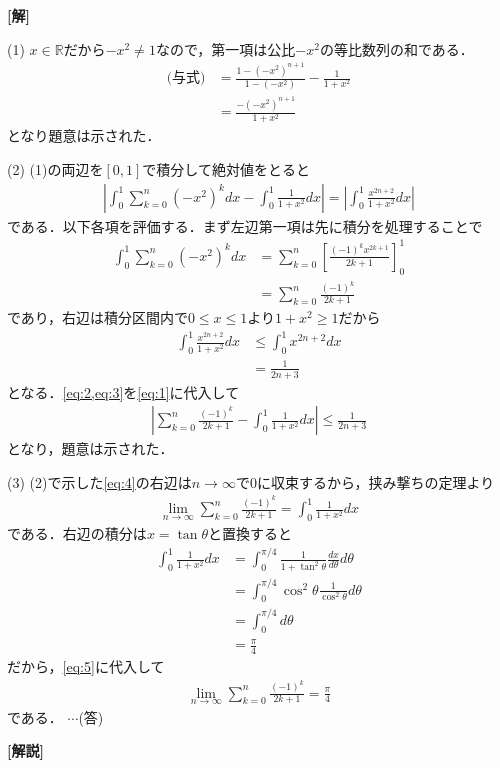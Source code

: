 \documentclass[a4paper,10pt]{ltjsarticle}
\begin{document}
\begin{multicols}{2}
  {\bf[解]}

  (1)
  $x \in \mathbb{R}$だから$-x^2 \neq 1$なので，第一項は公比$-x^2$の等比数列の和である．
  \begin{align*}
    \text{(与式)}
     & = \frac{1-(-x^2)^{n+1}}{1-(-x^2)} - \frac{1}{1+x^2} \\
     & = \frac{-(-x^2)^{n+1}}{1+x^2}
  \end{align*}
  となり題意は示された．

  \vspace{10pt}
  (2)
  (1)の両辺を$[0,1]$で積分して絶対値をとると
  \begin{align}
    \left| \int_0^1 \sum_{k=0}^n (-x^2)^k dx - \int_0^1 \frac{1}{1+x^2} dx \right|
    = \left| \int_0^1 \frac{x^{2n+2}}{1+x^2} dx \right| \label{eq:1}
  \end{align}
  である．以下各項を評価する．まず左辺第一項は先に積分を処理することで
  \begin{align}
    \int_0^1 \sum_{k=0}^n (-x^2)^k dx
     & = \sum_{k=0}^n \left[ \frac{(-1)^k x^{2k+1}}{2k+1} \right]_0^1 \nonumber \\
     & = \sum_{k=0}^n \frac{(-1)^k}{2k+1} \label{eq:2}
  \end{align}
  であり，右辺は積分区間内で$0\le x\le 1$より$1+x^2\ge 1$だから
  \begin{align}
    \int_0^1 \frac{x^{2n+2}}{1+x^2} dx
     & \le \int_0^1 x^{2n+2} dx      \nonumber \\
     & = \frac{1}{2n+3} \label{eq:3}
  \end{align}
  となる．\cref{eq:2,eq:3}を\cref{eq:1}に代入して
  \begin{align}
    \left| \sum_{k=0}^n \frac{(-1)^k}{2k+1} - \int_0^1 \frac{1}{1+x^2} dx \right| \le \frac{1}{2n+3} \label{eq:4}
  \end{align}
  となり，題意は示された．

  \vspace{10pt}
  (3)
  (2)で示した\cref{eq:4}の右辺は$n\to\infty$で$0$に収束するから，挟み撃ちの定理より
  \begin{align}
    \lim_{n\to\infty} \sum_{k=0}^n \frac{(-1)^k}{2k+1} = \int_0^1 \frac{1}{1+x^2} dx \label{eq:5}
  \end{align}
  である．右辺の積分は$x=\tan\theta$と置換すると
  \begin{align*}
    \int_0^1 \frac{1}{1+x^2} dx
     & = \int_0^{\pi/4} \frac{1}{1+\tan^2\theta} \frac{dx}{d\theta} d\theta \\
     & = \int_0^{\pi/4} \cos^2\theta \frac{1}{\cos^2\theta} d\theta         \\
     & = \int_0^{\pi/4} d\theta                                             \\
     & = \frac{\pi}{4}
  \end{align*}
  だから，\cref{eq:5}に代入して
  \begin{align*}
    \lim_{n\to\infty} \sum_{k=0}^n \frac{(-1)^k}{2k+1} = \frac{\pi}{4}
  \end{align*}
  である．  $\cdots$(答)


  \vspace{10pt}
  {\bf[解説]}

  \newpage
\end{multicols}
\end{document}
